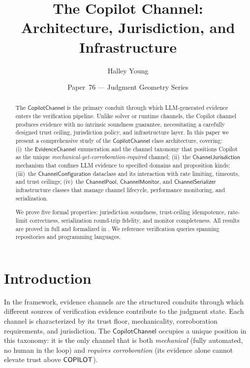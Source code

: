 \documentclass[11pt]{article}
\title{\textbf{The Copilot Channel:\\
Architecture, Jurisdiction, and Infrastructure}}
\author{Halley Young}
\date{Paper~76 --- Judgment Geometry Series}
\newcommand{\CopChan}{\mathsf{CopilotChannel}}
\newcommand{\EvChan}{\mathsf{EvidenceChannel}}
\newcommand{\ChanConfig}{\mathsf{ChannelConfiguration}}
\newcommand{\ChanJuris}{\mathsf{ChannelJurisdiction}}
\newcommand{\ChanPool}{\mathsf{ChannelPool}}
\newcommand{\ChanMon}{\mathsf{ChannelMonitor}}
\newcommand{\ChanSer}{\mathsf{ChannelSerializer}}
\begin{document}
\maketitle

\begin{abstract}
The $\CopChan$ is the primary conduit through which LLM-generated
evidence enters the \JuGeo{} verification pipeline.  Unlike solver
or runtime channels, the Copilot channel produces evidence with no
intrinsic soundness guarantee, necessitating a carefully designed
trust ceiling, jurisdiction policy, and infrastructure layer.  In
this paper we present a comprehensive study of the $\CopChan$ class
architecture, covering:
(i)~the $\EvChan$ enumeration and the channel taxonomy that positions
Copilot as the unique \emph{mechanical-yet-corroboration-required}
channel;
(ii)~the $\ChanJuris$ mechanism that confines LLM evidence to
specified domains and proposition kinds;
(iii)~the $\ChanConfig$ dataclass and its interaction with rate
limiting, timeouts, and trust ceilings;
(iv)~the $\ChanPool$, $\ChanMon$, and $\ChanSer$ infrastructure
classes that manage channel lifecycle, performance monitoring, and
serialization.

We prove five formal properties: jurisdiction soundness, trust-ceiling
idempotence, rate-limit correctness, serialization round-trip
fidelity, and monitor completeness.  All results are proved in full
and formalized in \LEAN.  We reference
\pSevenSixQueries{} verification queries spanning
\pSevenSixUniqueRepos{} repositories and
\pSevenSixLanguages{} programming languages.
\end{abstract}

\section{Introduction}
\label{sec:intro}

In the \JuGeo{} framework, evidence channels are the structured
conduits through which different sources of verification evidence
contribute to the judgment state.  Each channel is characterized by
its trust floor, mechanicality, corroboration requirements, and
jurisdiction.  The $\CopChan$ occupies a unique position in this
taxonomy: it is the only channel that is both \emph{mechanical}
(fully automated, no human in the loop) and \emph{requires
corroboration} (its evidence alone cannot elevate trust above
$\mathsf{COPILOT}$).
\end{document}
